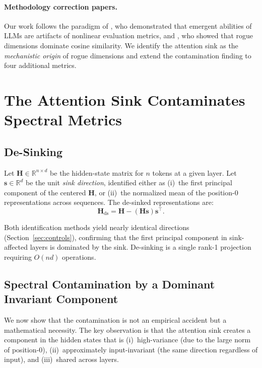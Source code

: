 \documentclass[11pt]{article}
\begin{document}
\paragraph{Methodology correction papers.}
Our work follows the paradigm of \citet{schaeffer2024emergent}, who demonstrated that emergent abilities of LLMs are artifacts of nonlinear evaluation metrics, and \citet{timkey2021all}, who showed that rogue dimensions dominate cosine similarity. We identify the attention sink as the \emph{mechanistic origin} of rogue dimensions and extend the contamination finding to four additional metrics.

\section{The Attention Sink Contaminates Spectral Metrics}\label{sec:theory}

\subsection{De-Sinking}\label{sec:desink}

\begin{definition}[De-sinking]
Let $\mathbf{H} \in \mathbb{R}^{n \times d}$ be the hidden-state matrix for $n$ tokens at a given layer. Let $\mathbf{s} \in \mathbb{R}^d$ be the unit \emph{sink direction}, identified either as (i)~the first principal component of the centered $\mathbf{H}$, or (ii)~the normalized mean of the position-0 representations across sequences. The de-sinked representations are:
\begin{equation}
    \mathbf{H}_{\text{ds}} = \mathbf{H} - (\mathbf{H}\mathbf{s})\mathbf{s}^\top.
\end{equation}
\end{definition}

Both identification methods yield nearly identical directions (Section~\ref{sec:controls}), confirming that the first principal component in sink-affected layers is dominated by the sink. De-sinking is a single rank-1 projection requiring $O(nd)$ operations.

\subsection{Spectral Contamination by a Dominant Invariant Component}\label{sec:theorem}

We now show that the contamination is not an empirical accident but a mathematical necessity. The key observation is that the attention sink creates a component in the hidden states that is (i)~high-variance (due to the large norm of position-0), (ii)~approximately input-invariant (the same direction regardless of input), and (iii)~shared across layers.
\end{document}
